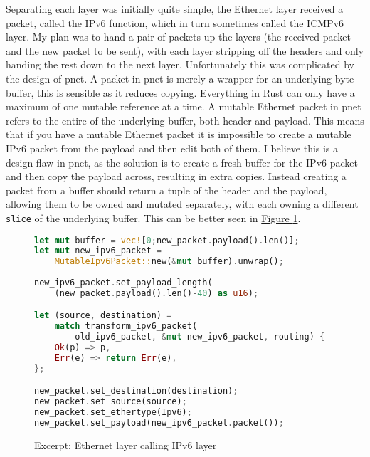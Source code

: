 \documentclass[12pt,a4paper,twoside,openright]{report}
\begin{document}
\bigskip

Separating each layer was initially quite simple, the Ethernet layer received a packet, called the IPv6 function, which in turn sometimes called the ICMPv6 layer.  My plan was to hand a pair of packets up the layers (the received packet and the new packet to be sent), with each layer stripping off the headers and only handing the rest down to the next layer.  Unfortunately this was complicated by the design of pnet.  A packet in pnet is merely a wrapper for an underlying byte buffer, this is sensible as it reduces copying.  Everything in Rust can only have a maximum of one mutable reference at a time.  A mutable Ethernet packet in pnet refers to the entire of the underlying buffer, both header and payload.  This means that if you have a mutable Ethernet packet it is impossible to create a mutable IPv6 packet from the payload and then edit both of them.  I believe this is a design flaw in pnet, as the solution is to create a fresh buffer for the IPv6 packet and then copy the payload across, resulting in extra copies. Instead creating a packet from a buffer should return a tuple of the header and the payload, allowing them to be owned and mutated separately, with each owning a different \verb!slice! of the underlying buffer. This can be better seen in  \hyperref[fig::mutability]{Figure }\ref{fig::mutability}.

\begin{figure}
\centering
\begin{varwidth}{\linewidth}
\begin{lstlisting}[language=Rust]
let mut buffer = vec![0;new_packet.payload().len()];
let mut new_ipv6_packet = 
    MutableIpv6Packet::new(&mut buffer).unwrap();
    
new_ipv6_packet.set_payload_length(
    (new_packet.payload().len()-40) as u16);

let (source, destination) = 
    match transform_ipv6_packet(
        old_ipv6_packet, &mut new_ipv6_packet, routing) {
    Ok(p) => p,
    Err(e) => return Err(e),
};

new_packet.set_destination(destination);
new_packet.set_source(source);
new_packet.set_ethertype(Ipv6);
new_packet.set_payload(new_ipv6_packet.packet());
\end{lstlisting}
\end{varwidth}
\caption{Excerpt: Ethernet layer calling IPv6 layer}
\label{fig::mutability}
\end{figure}

\bigskip
\end{document}
